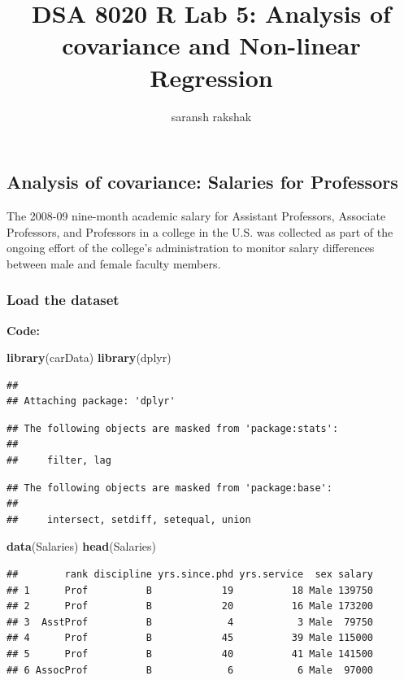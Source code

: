 \documentclass[
]{article}
\title{DSA 8020 R Lab 5: Analysis of covariance and Non-linear
Regression}
\author{saransh rakshak}
\date{}
\newenvironment{Shaded}{\begin{snugshade}}{\end{snugshade}}
\newcommand{\FunctionTok}[1]{\textcolor[rgb]{0.13,0.29,0.53}{\textbf{#1}}}
\newcommand{\NormalTok}[1]{#1}
\begin{document}
\maketitle

{
\setcounter{tocdepth}{3}
\tableofcontents
}
\subsection{Analysis of covariance: Salaries for
Professors}\label{analysis-of-covariance-salaries-for-professors}

The 2008-09 nine-month academic salary for Assistant Professors,
Associate Professors, and Professors in a college in the U.S. was
collected as part of the ongoing effort of the college's administration
to monitor salary differences between male and female faculty members.

\subsubsection{Load the dataset}\label{load-the-dataset}

\textbf{Code:}

\begin{Shaded}
\begin{Highlighting}[]
\FunctionTok{library}\NormalTok{(carData)}
\FunctionTok{library}\NormalTok{(dplyr)}
\end{Highlighting}
\end{Shaded}

\begin{verbatim}
## 
## Attaching package: 'dplyr'
\end{verbatim}

\begin{verbatim}
## The following objects are masked from 'package:stats':
## 
##     filter, lag
\end{verbatim}

\begin{verbatim}
## The following objects are masked from 'package:base':
## 
##     intersect, setdiff, setequal, union
\end{verbatim}

\begin{Shaded}
\begin{Highlighting}[]
\FunctionTok{data}\NormalTok{(Salaries)}
\FunctionTok{head}\NormalTok{(Salaries)}
\end{Highlighting}
\end{Shaded}

\begin{verbatim}
##        rank discipline yrs.since.phd yrs.service  sex salary
## 1      Prof          B            19          18 Male 139750
## 2      Prof          B            20          16 Male 173200
## 3  AsstProf          B             4           3 Male  79750
## 4      Prof          B            45          39 Male 115000
## 5      Prof          B            40          41 Male 141500
## 6 AssocProf          B             6           6 Male  97000
\end{verbatim}
\end{document}
